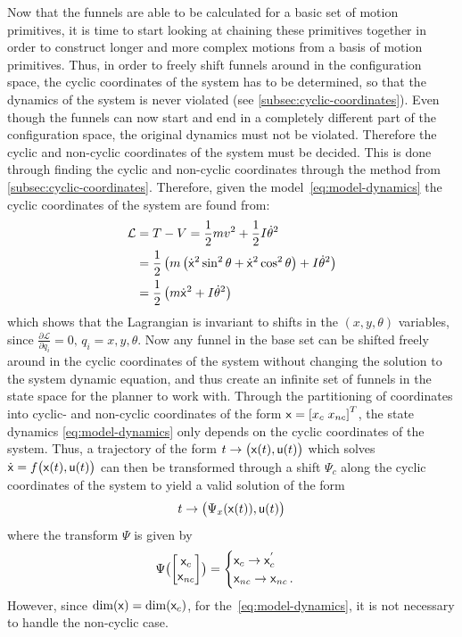 Now that the funnels are able to be calculated for a basic set of motion
primitives, it is time to start looking at chaining these primitives together in
order to construct longer and more complex motions from a basis of motion
primitives. Thus, in order to freely shift funnels around in the configuration
space, the cyclic coordinates of the system has to be determined, so that the
dynamics of the system is never violated (see \cref{subsec:cyclic-coordinates}).
Even though the funnels can now start and end in a completely different part of
the configuration space, the original dynamics must not be violated. Therefore
the cyclic and non-cyclic coordinates of the system must be decided. This is
done through finding the cyclic and non-cyclic coordinates through the method
from \cref{subsec:cyclic-coordinates}. Therefore, given the
model~\cref{eq:model-dynamics} the cyclic coordinates of the system are found
from:
\begin{align*}
  \mathcal{L} &= T - V = \frac{1}{2} mv^2 + \frac{1}{2}I\dot{\theta}^2 \\ 
              &= \frac{1}{2} \left(  m \left(
                \dot{{\mathbf{\mathsf{x}}}}^2 \sin^2 \theta + \dot{{\mathbf{\mathsf{x}}}}^2 \cos^2 \theta
                \right)  + I {\dot{\theta}}^2 \right) \\
              &= \frac{1}{2} \left(  m\dot{{\mathbf{\mathsf{x}}}}^2 + I {\dot{\theta}}^2 \right)
\end{align*}
which shows that the Lagrangian is invariant to shifts in the \((x,y,\theta)\)
variables, since \(\frac{\partial\mathcal{L}}{\partial q_i} = 0, \, q_i =
x,y,\theta\). Now any funnel in the base set can be shifted freely around in the
cyclic coordinates of the system without changing the solution to the system
dynamic equation, and thus create an infinite set of funnels in the state space
for the planner to work with. Through the partitioning of coordinates into
cyclic- and non-cyclic coordinates of the form \({\mathbf{\mathsf{x}}} = \left[ x_c\; x_{nc}
\right]^{T }\), the state dynamics \cref{eq:model-dynamics} only depends on the
cyclic coordinates of the system. Thus, a trajectory of the form \(t \rightarrow
\bigl( {\mathbf{\mathsf{x}}}(t), {\mathbf{\mathsf{u}}}(t) \bigr) \) which solves \(\dot{{\mathbf{\mathsf{x}}}} = f
\bigl({\mathbf{\mathsf{x}}}(t), {\mathbf{\mathsf{u}}}(t) \bigl) \) can then be transformed through a shift
\(\Psi_{c}\) along the cyclic coordinates of the system to yield a valid
solution of the form
\[
  t \rightarrow \bigl( \Psi_{x}({\mathbf{\mathsf{x}}}(t)), {\mathbf{\mathsf{u}}}(t) \bigr)
\]
where the transform \(\Psi\) is given by
\[
  \Psi \bigl( \begin{bmatrix}
    {\mathbf{\mathsf{x}}}_{c}  \\ {\mathbf{\mathsf{x}}}_{\mathit{nc}} 
  \end{bmatrix}
  \bigr) =
  \begin{cases}
    {\mathbf{\mathsf{x}}}_{c} \rightarrow {\mathbf{\mathsf{x}}}^{'}_{c} \\
    {\mathbf{\mathsf{x}}}_{\mathit{nc}} \rightarrow {\mathbf{\mathsf{x}}}_{\mathit{nc}} \, .
  \end{cases}
\]
However, since \( \dim ({\mathbf{\mathsf{x}}}) = \dim({\mathbf{\mathsf{x}}}_{c}) \), for
the~\cref{eq:model-dynamics}, it is not necessary to handle the non-cyclic case.

